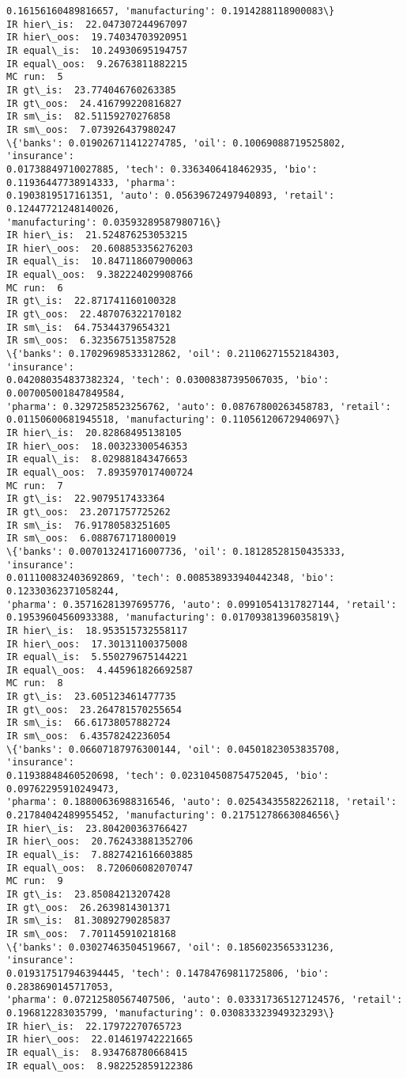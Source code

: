\documentclass[11pt]{article}
\begin{document}
\begin{Verbatim}[commandchars=\\\{\},fontsize=\footnotesize]
0.16156160489816657, 'manufacturing': 0.1914288118900083\}
IR hier\_is:  22.047307244967097
IR hier\_oos:  19.74034703920951
IR equal\_is:  10.24930695194757
IR equal\_oos:  9.26763811882215
MC run:  5
IR gt\_is:  23.774046760263385
IR gt\_oos:  24.416799220816827
IR sm\_is:  82.51159270276858
IR sm\_oos:  7.073926437980247
\{'banks': 0.019026711412274785, 'oil': 0.10069088719525802, 'insurance':
0.01738849710027885, 'tech': 0.3363406418462935, 'bio': 0.11936447738914333, 'pharma':
0.1903819517161351, 'auto': 0.05639672497940893, 'retail': 0.12447721248140026,
'manufacturing': 0.03593289587980716\}
IR hier\_is:  21.524876253053215
IR hier\_oos:  20.608853356276203
IR equal\_is:  10.847118607900063
IR equal\_oos:  9.382224029908766
MC run:  6
IR gt\_is:  22.871741160100328
IR gt\_oos:  22.487076322170182
IR sm\_is:  64.75344379654321
IR sm\_oos:  6.323567513587528
\{'banks': 0.17029698533312862, 'oil': 0.21106271552184303, 'insurance':
0.042080354837382324, 'tech': 0.03008387395067035, 'bio': 0.007005001847849584,
'pharma': 0.3297258523256762, 'auto': 0.08767800263458783, 'retail':
0.01150600681945518, 'manufacturing': 0.11056120672940697\}
IR hier\_is:  20.82868495138105
IR hier\_oos:  18.00323300546353
IR equal\_is:  8.029881843476653
IR equal\_oos:  7.893597017400724
MC run:  7
IR gt\_is:  22.9079517433364
IR gt\_oos:  23.2071757725262
IR sm\_is:  76.91780583251605
IR sm\_oos:  6.088767171800019
\{'banks': 0.007013241716007736, 'oil': 0.18128528150435333, 'insurance':
0.011100832403692869, 'tech': 0.008538933940442348, 'bio': 0.12330362371058244,
'pharma': 0.35716281397695776, 'auto': 0.09910541317827144, 'retail':
0.19539604560933388, 'manufacturing': 0.01709381396035819\}
IR hier\_is:  18.953515732558117
IR hier\_oos:  17.30131100375008
IR equal\_is:  5.550279675144221
IR equal\_oos:  4.445961826692587
MC run:  8
IR gt\_is:  23.605123461477735
IR gt\_oos:  23.264781570255654
IR sm\_is:  66.61738057882724
IR sm\_oos:  6.43578242236054
\{'banks': 0.06607187976300144, 'oil': 0.04501823053835708, 'insurance':
0.11938848460520698, 'tech': 0.023104508754752045, 'bio': 0.09762295910249473,
'pharma': 0.18800636988316546, 'auto': 0.02543435582262118, 'retail':
0.21784042489955452, 'manufacturing': 0.21751278663084656\}
IR hier\_is:  23.804200363766427
IR hier\_oos:  20.762433881352706
IR equal\_is:  7.8827421616603885
IR equal\_oos:  8.720606082070747
MC run:  9
IR gt\_is:  23.85084213207428
IR gt\_oos:  26.2639814301371
IR sm\_is:  81.30892790285837
IR sm\_oos:  7.701145910218168
\{'banks': 0.03027463504519667, 'oil': 0.1856023565331236, 'insurance':
0.019317517946394445, 'tech': 0.14784769811725806, 'bio': 0.2838690145717053,
'pharma': 0.07212580567407506, 'auto': 0.033317365127124576, 'retail':
0.196812283035799, 'manufacturing': 0.030833323949323293\}
IR hier\_is:  22.17972270765723
IR hier\_oos:  22.014619742221665
IR equal\_is:  8.934768780668415
IR equal\_oos:  8.982252859122386

    \end{Verbatim}
\end{document}

